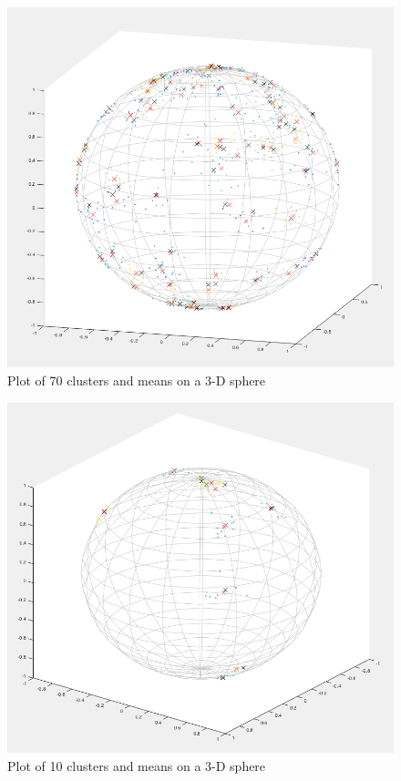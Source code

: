 \documentclass[../tech_report_1.tex]{subfiles}
\begin{document}
\begin{figure}[H]
\caption{Plot of 70 clusters and means on a 3-D sphere}
\includegraphics[width=1\textwidth]{sphere_points_70_clusters}
\end{figure}


\begin{figure}[H]
\caption{Plot of 10 clusters and means on a 3-D sphere}
\includegraphics[width=1\textwidth]{sphere_points_10_clusters}
\end{figure}
\end{document}
